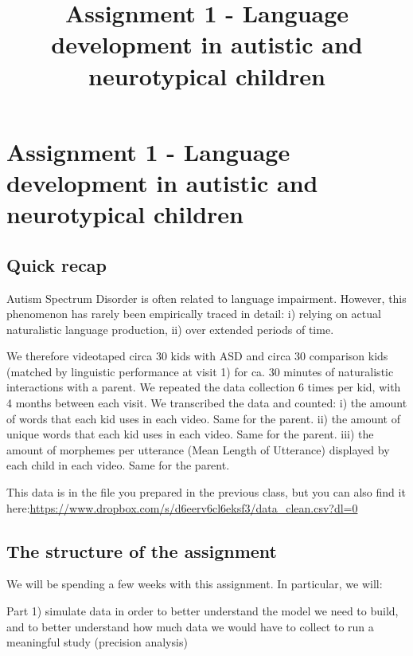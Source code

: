 \documentclass[
]{article}
\title{Assignment 1 - Language development in autistic and neurotypical
children}
\author{}
\date{\vspace{-2.5em}}
\begin{document}
\maketitle

\hypertarget{assignment-1---language-development-in-autistic-and-neurotypical-children}{%
\section{Assignment 1 - Language development in autistic and
neurotypical
children}\label{assignment-1---language-development-in-autistic-and-neurotypical-children}}

\hypertarget{quick-recap}{%
\subsection{Quick recap}\label{quick-recap}}

Autism Spectrum Disorder is often related to language impairment.
However, this phenomenon has rarely been empirically traced in detail:
i) relying on actual naturalistic language production, ii) over extended
periods of time.

We therefore videotaped circa 30 kids with ASD and circa 30 comparison
kids (matched by linguistic performance at visit 1) for ca. 30 minutes
of naturalistic interactions with a parent. We repeated the data
collection 6 times per kid, with 4 months between each visit. We
transcribed the data and counted: i) the amount of words that each kid
uses in each video. Same for the parent. ii) the amount of unique words
that each kid uses in each video. Same for the parent. iii) the amount
of morphemes per utterance (Mean Length of Utterance) displayed by each
child in each video. Same for the parent.

This data is in the file you prepared in the previous class, but you can
also find it
here:\url{https://www.dropbox.com/s/d6eerv6cl6eksf3/data_clean.csv?dl=0}

\hypertarget{the-structure-of-the-assignment}{%
\subsection{The structure of the
assignment}\label{the-structure-of-the-assignment}}

We will be spending a few weeks with this assignment. In particular, we
will:

Part 1) simulate data in order to better understand the model we need to
build, and to better understand how much data we would have to collect
to run a meaningful study (precision analysis)
\end{document}

